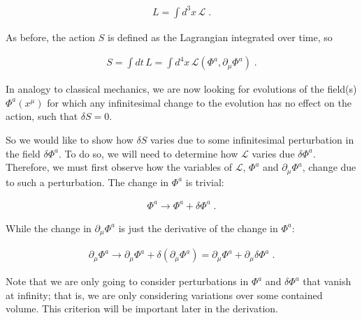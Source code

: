 \documentclass[10pt]{article}
\begin{document}
               		\begin{align}\label{eq:density}
               		    L = \int d^3x \, \mathcal{L} \; .
               		\end{align}
               		
               		As before, the action $S$ is defined as the Lagrangian integrated over time, so
               	
               	    \begin{align}\label{fieldAction}
               	        S = \int dt \, L = \int d^4x \, \mathcal{L}(\Phi^a,\partial_\mu \Phi^a) \; .
               	    \end{align}
               	    
               	    In analogy to classical mechanics, we are now looking for evolutions of the field(s) $\Phi^a(x^\mu)$ for which any infinitesimal change to the evolution has no effect on the action, such that $\delta S = 0$.
               		
               		So we would like to show how $\delta S$ varies due to some infinitesimal perturbation in the field $\delta \Phi^a$. To do so, we will need to determine how $\mathcal{L}$ varies due $\delta \Phi^a$. Therefore, we must first observe how the variables of $\mathcal{L}$, $\Phi^a$ and $\partial_\mu \Phi^a$, change due to such a perturbation. The change in $\Phi^a$ is trivial: 
               		
               		\begin{align}\label{phivar}
               		\Phi^a \rightarrow{} \Phi^a + \delta \Phi^a \; .
               		\end{align}
               		
               		While the change in  $\partial_\mu \Phi^a$ is just the derivative of the change in $\Phi^a$:
               		
               		\begin{align}\label{dphivar}
               		\partial_\mu \Phi^a \rightarrow{} \partial_\mu \Phi^a + \delta (\partial_\mu \Phi^a)  =  \partial_\mu \Phi^a + \partial_\mu \delta \Phi^a \; .
               		\end{align}
               		
               		Note that we are only going to consider perturbations in $\Phi^a$ and $\delta \Phi^a$ that vanish at infinity; that is, we are only considering variations over some contained volume. This criterion will be important later in the derivation.
               		
\end{document}
